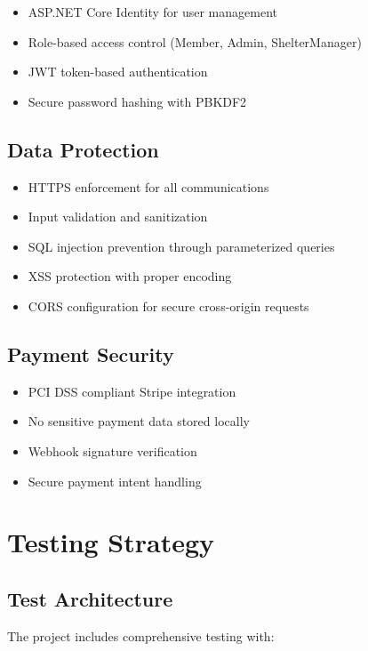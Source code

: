 \documentclass[12pt,a4paper]{article}
\begin{document}
\begin{itemize}
    \item ASP.NET Core Identity for user management
    \item Role-based access control (Member, Admin, ShelterManager)
    \item JWT token-based authentication
    \item Secure password hashing with PBKDF2
\end{itemize}

\subsection{Data Protection}

\begin{itemize}
    \item HTTPS enforcement for all communications
    \item Input validation and sanitization
    \item SQL injection prevention through parameterized queries
    \item XSS protection with proper encoding
    \item CORS configuration for secure cross-origin requests
\end{itemize}

\subsection{Payment Security}

\begin{itemize}
    \item PCI DSS compliant Stripe integration
    \item No sensitive payment data stored locally
    \item Webhook signature verification
    \item Secure payment intent handling
\end{itemize}

\section{Testing Strategy}

\subsection{Test Architecture}

The project includes comprehensive testing with:
\end{document}
